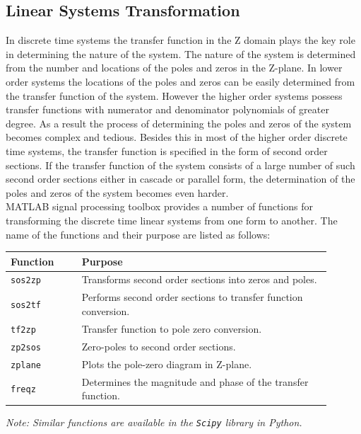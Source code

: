 \documentclass{lab_sheet}
\begin{document}
\subsection{Linear Systems Transformation}
In discrete time systems the transfer function in the Z domain plays the key role in determining the nature of the system. The nature of the system is determined from the number and locations of the poles and zeros in the Z-plane. In lower order systems the locations of the poles and zeros can be easily determined from the transfer function of the system. However the higher order systems possess transfer functions with numerator and denominator polynomials of greater degree. As a result the process of determining the poles and zeros of the system becomes complex and tedious. Besides this in most of the higher order discrete time systems, the transfer function is specified in the form of second order sections. If the transfer function of the system consists of a large number of such second order sections either in cascade or parallel form, the determination of the poles and zeros of the system becomes even harder.\\MATLAB signal processing toolbox provides a number of functions for transforming the discrete time linear systems from one form to another. The name of the functions and their purpose are listed as follows:
\begin{longtable}[H]
    {|m{0.2\linewidth}|m{0.7\linewidth}|}
        \hline
        \textbf{Function}&\textbf{Purpose}\\
        \hline\hline
        \texttt{sos2zp}&Transforms second order sections into zeros and poles.\\
        \hline
        \texttt{sos2tf}&Performs second order sections to transfer function conversion.\\
        \hline
        \texttt{tf2zp}&Transfer function to pole zero conversion.\\
        \hline
        \texttt{zp2sos}&Zero-poles to second order sections.\\
        \hline
        \texttt{zplane}&Plots the pole-zero diagram in Z-plane.\\
        \hline
        \texttt{freqz}&Determines the magnitude and phase of the transfer function.\\
        \hline
\end{longtable}
\textit{Note: Similar functions are available in the \texttt{Scipy} library in Python.}
\end{document}
